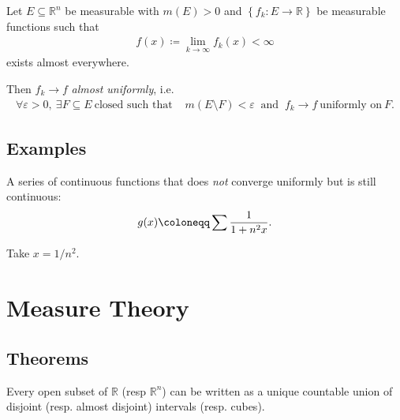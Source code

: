 \begin{theorem}[Egorov]

Let \(E \subseteq {\mathbb{R}}^n\) be measurable with \(m(E) > 0\) and
\(\left\{{f_k: E \to {\mathbb{R}}}\right\}\) be measurable functions
such that
\begin{align*}  
f(x) \coloneqq\lim_{k\to\infty} f_k(x) < \infty 
\end{align*}
exists almost everywhere.

Then \(f_k \to f\) \emph{almost uniformly}, i.e.
\begin{align*}
\forall\varepsilon > 0, ~\exists F \subseteq E ~\text{closed such that } &
m(E\setminus F) < \varepsilon ~\text{ and }~ f_k\to f ~\text{uniformly on}~ F
.\end{align*}

\end{theorem}

\hypertarget{examples}{%
\subsection{Examples}\label{examples}}

\begin{example}[?]

A series of continuous functions that does \emph{not} converge uniformly
but is still continuous:
\begin{align*}  
g(x) \coloneqq\sum {1 \over 1 + n^2 x}
.\end{align*}

Take \(x = 1/n^2\).

\end{example}

\hypertarget{measure-theory}{%
\section{Measure Theory}\label{measure-theory}}

\hypertarget{theorems-1}{%
\subsection{Theorems}\label{theorems-1}}

\begin{proposition}

Every open subset of \({\mathbb{R}}\) (resp \({\mathbb{R}}^n\)) can be
written as a unique countable union of disjoint (resp. almost disjoint)
intervals (resp. cubes).

\end{proposition}

